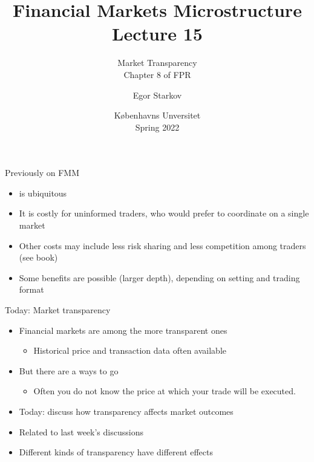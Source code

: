 \documentclass[english,10pt
,aspectratio=169
]{beamer}
\title{Financial Markets Microstructure \\ Lecture 15}
\subtitle{Market Transparency\\
	Chapter 8 of FPR}
\author{Egor Starkov}
\date{K{\o}benhavns Unversitet \\
	Spring 2022}
\begin{document}
\frame[plain]{\titlepage}


\begin{frame}{Previously on FMM}
	\begin{itemize}
		\item {} is ubiquitous 
		\item It is costly for uninformed traders, who would prefer to coordinate on a single market
		\item Other costs may include less risk sharing and less competition among traders (see book)
		\item Some benefits are possible (larger depth), depending on setting and trading format
	\end{itemize}
\end{frame}


\begin{frame}{Today: Market transparency}
	\begin{itemize}
		\item Financial markets are among the more transparent ones
		\begin{itemize}
			\item Historical price and transaction data often available
		\end{itemize}
		\item But there are a ways to go
		\begin{itemize}
			\item Often you do not know the price at which your trade will be executed.
		\end{itemize}
		\bigskip\pause
		\item Today: discuss how transparency affects market outcomes
		\item Related to last week's discussions
		\item Different kinds of transparency have different effects
	\end{itemize}
\end{frame}
\end{document}
